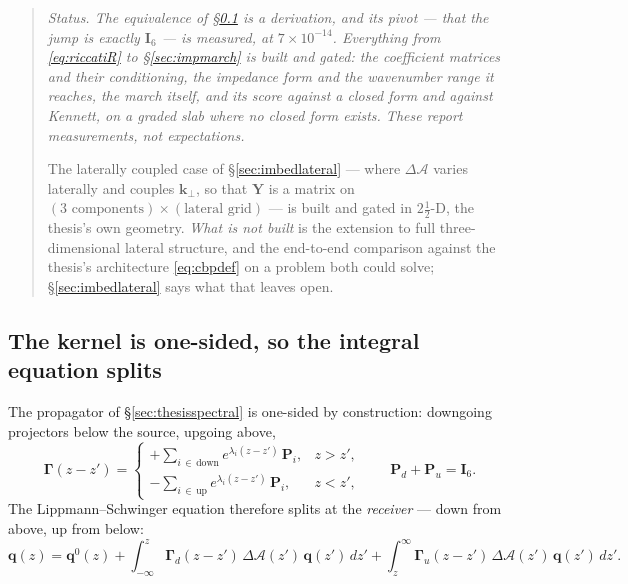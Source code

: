 \documentclass[11pt,a4paper]{article}
\newcommand{\bq}{\mathbf{q}}
\newcommand{\bP}{\mathbf{P}}
\newcommand{\dA}{\Delta\mathcal{A}}
\newcommand{\Isix}{\mathbf{I}_{6}}
\newcommand{\bY}{\mathbf{Y}}
\begin{document}
\begin{quote}
\small\itshape
Status.  The equivalence of \S\ref{sec:leibniz} is a derivation, and its pivot
--- that the jump is exactly $\Isix$ --- is measured, at $7\times10^{-14}$.
Everything from \eqref{eq:riccatiR} to \S\ref{sec:impmarch} is built and gated:
the coefficient matrices and their conditioning, the impedance form and the
wavenumber range it reaches, the march itself, and its score against a closed
form and against Kennett, on a graded slab where no closed form exists.  These
report measurements, not expectations.

The laterally coupled case of \S\ref{sec:imbedlateral} --- where $\dA$ varies
laterally and couples $\mathbf{k}_\perp$, so that $\bY$ is a matrix on
$(\text{3 components})\times(\text{lateral grid})$ --- is built and gated in
$2\tfrac12$-D, the thesis's own geometry.  \emph{What is not built} is the
extension to full three-dimensional lateral structure, and the end-to-end
comparison against the thesis's architecture \eqref{eq:cbpdef} on a problem
both could solve; \S\ref{sec:imbedlateral} says what that leaves open.
\end{quote}

\subsection{The kernel is one-sided, so the integral equation splits}
\label{sec:leibniz}

The propagator of \S\ref{sec:thesisspectral} is one-sided by construction:
downgoing projectors below the source, upgoing above,
\begin{equation}\label{eq:onesided}
  \boldsymbol\Gamma(z-z') =
  \begin{cases}
    +\sum_{i\,\in\,\text{down}} e^{\lambda_i (z-z')}\,\bP_i, & z>z',\\[2pt]
    -\sum_{i\,\in\,\text{up}} e^{\lambda_i (z-z')}\,\bP_i,   & z<z',
  \end{cases}
  \qquad \bP_d + \bP_u = \Isix .
\end{equation}
The Lippmann--Schwinger equation therefore splits at the \emph{receiver} --- down
from above, up from below:
\begin{equation}\label{eq:lssplit}
  \bq(z) = \bq^{0}(z)
  + \int_{-\infty}^{z}\!\boldsymbol\Gamma_{d}(z-z')\,\dA(z')\,\bq(z')\,dz'
  + \int_{z}^{\infty}\!\boldsymbol\Gamma_{u}(z-z')\,\dA(z')\,\bq(z')\,dz' .
\end{equation}
\end{document}
